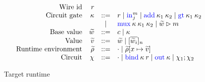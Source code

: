 \begin{figure}
  \small
  \[
  \begin{array}{rrcl}
    \ftext{Wire id} & r &&\\
    \ftext{Circuit gate} & \kappa & ::= & r \mid \kw{in}^{m}_{j} \mid \kw{add}\:\kappa_{1}\:\kappa_{2} \mid \kw{gt}\:\kappa_{1}\:\kappa_{2}\\
    & & \mid & \kw{mux}\:\kappa\:\kappa_{1}\:\kappa_{2} \mid \widetilde{w} \rhd m\\
    \ftext{Base value} & \widetilde{w} & ::= & c \mid \kappa\\
    \ftext{Value} & \widetilde{v} & ::= & \widetilde{w} \mid [\overline{\widetilde{w}_{i}}]_{n}\\
    \ftext{Runtime environment} & \widetilde{\rho} & ::= & \cdot \mid \widetilde{\rho}[x \mapsto \widetilde{v}]\\
    \ftext{Circuit} & \chi & ::= & \cdot \mid \kw{bind}\:\kappa\:r \mid \kw{out}\:\kappa \mid \chi_{1}; \chi_{2}
  \end{array}
  \]
\caption{Target runtime}
\label{fig:tgtruntime}
\end{figure}


